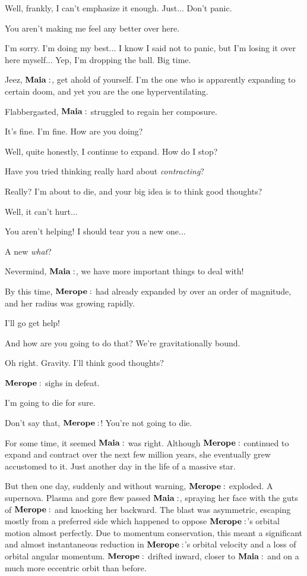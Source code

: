 \Maia Well, frankly, I can't emphasize it enough.  Just... Don't panic.

\Merope You aren't making me feel any better over here.

\Maia I'm sorry.  I'm doing my best... I know I said not to panic, but I'm losing it over here myself...  Yep, I'm dropping the ball.  Big time.

\Meropa  Jeez, $\Maia$, get ahold of yourself.  I'm the one who is apparently expanding to certain doom, and yet you are the one hyperventilating.

Flabbergasted, $\Maia$ struggled to regain her composure.

\Maia It's fine.  I'm fine.  How are you doing?

\Merope Well, quite honestly, I continue to expand.  How do I stop?

\Maia Have you tried thinking really hard about \textit{contracting}?

\Merope Really?  I'm about to die, and your big idea is to think good thoughts?  

\Maia Well, it can't hurt...

\Merope You aren't helping!  I should tear you a new one...

\Maia A new \textit{what}?

\Merope Nevermind, $\Maia$, we have more important things to deal with!

By this time, $\Merope$ had already expanded by over an order of magnitude, and her radius was growing rapidly.  

\Maia I'll go get help!

\Merope And how are you going to do that?  We're gravitationally bound.

\Maia Oh right.  Gravity.  I'll think good thoughts?

$\Merope$ sighs in defeat.

\Merope I'm going to die for sure.

\Maia Don't say that, $\Merope$!  You're not going to die.

For some time, it seemed $\Maia$ was right.  Although $\Merope$ continued to expand and contract over the next few million years, she eventually grew accustomed to it.  Just another day in the life of a massive star.

But then one day, suddenly and without warning, $\Merope$ exploded.  A supernova.  Plasma and gore flew passed $\Maia$, spraying her face with the guts of $\Merope$ and knocking her backward.  The blast was asymmetric, escaping mostly from a preferred side which happened to oppose $\Merope$'s orbital motion almost perfectly.  Due to momentum conservation, this meant a significant and almost instantaneous reduction in $\Merope$'s orbital velocity and a loss of orbital angular momentum.  $\Merope$ drifted inward, closer to $\Maia$ and on a much more eccentric orbit than before.  

